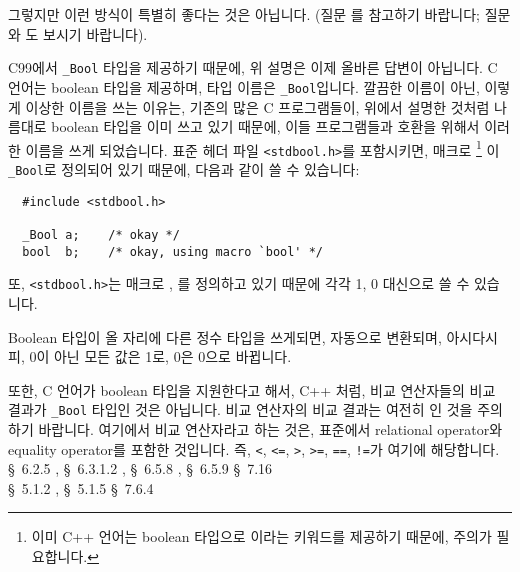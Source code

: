\begin{faq}
	그렇지만 이런 방식이 특별히 좋다는 것은 아닙니다.  (질문 를
	참고하기 바랍니다; 질문 와 도 보시기 바랍니다).

\T
	C99에서 \verb+_Bool+ 타입을 제공하기 때문에, 위 설명은 이제 올바른
        답변이 아닙니다. C 언어는 boolean 타입을 제공하며, 타입 이름은
        \verb+_Bool+입니다. 깔끔한 이름이 아닌, 이렇게 이상한 이름을 쓰는
        이유는, 기존의 많은 C 프로그램들이, 위에서 설명한 것처럼 나름대로
        boolean 타입을 이미 쓰고 있기 때문에, 이들 프로그램들과 호환을 위해서
        이러한 이름을 쓰게 되었습니다. 표준 헤더 파일 \verb+<stdbool.h>+를
        포함시키면, 매크로 \footnote{이미 C++ 언어는 boolean 타입으로
          이라는 키워드를 제공하기 때문에, 주의가 필요합니다.}
        이 \verb+_Bool+로 정의되어 있기 때문에,
        다음과 같이 쓸 수 있습니다:
\begin{verbatim}
  #include <stdbool.h>

  _Bool a;    /* okay */
  bool  b;    /* okay, using macro `bool' */
\end{verbatim}
	\noindent 또, \verb+<stdbool.h>+는 매크로 , 를
        정의하고 있기 때문에 각각 1, 0 대신으로 쓸 수 있습니다.
        
        Boolean 타입이 올 자리에 다른 정수 타입을 쓰게되면, 자동으로 변환되며,
        아시다시피, 0이 아닌 모든 값은 1로, 0은 0으로 바뀝니다.

        또한, C 언어가 boolean 타입을 지원한다고 해서, C++ 처럼, 
        비교 연산자들의 비교 결과가 \verb+_Bool+ 타입인
        것은 아닙니다. 비교 연산자의 비교 결과는 여전히 인 것을
        주의하기 바랍니다. 여기에서 비교 연산자라고 하는 것은,
        표준에서 relational operator와 equality operator를 포함한 것입니다.
        즉, \verb+<+, \verb+<=+, \verb+>+, \verb+>=+, \verb+==+,
        \verb+!=+가 여기에 해당합니다.
\R
	\cite{c89} \S\ 6.2.5 , \S\ 6.3.1.2 , 
                   \S\ 6.5.8 , \S\ 6.5.9 
                   \S\ 7.16  \\
	\cite{hs5} \S\ 5.1.2 , \S\ 5.1.5 
                   \S\ 7.6.4 
\end{faq}


